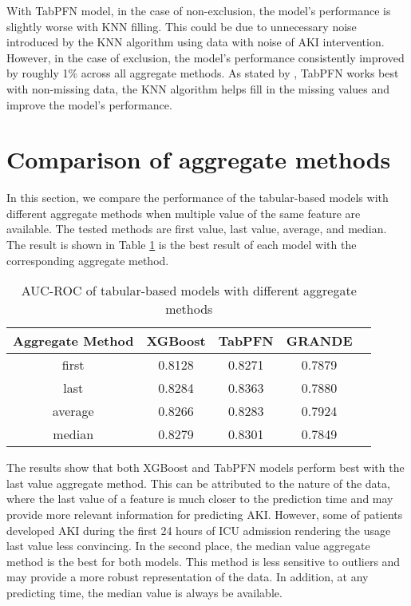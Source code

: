 \documentclass[../main.tex]{subfiles}
\begin{document}
With TabPFN model, in the case of non-exclusion, the model's performance is slightly worse with KNN filling.
This could be due to unnecessary noise introduced by the KNN algorithm using data with noise of AKI intervention.
However, in the case of exclusion, the model's performance consistently improved by roughly 1\% across all aggregate methods.
As stated by \citeauthor{tabpfn}, TabPFN works best with non-missing data, the KNN algorithm helps fill in the missing values and improve the model's performance.



\section{Comparison of aggregate methods}
\label{sec:aggregate_methods}

In this section, we compare the performance of the tabular-based models with different aggregate methods when multiple value of the same feature are available.
The tested methods are first value, last value, average, and median.
The result is shown in Table \ref{tab:aggregate_methods} is the best result of each model with the corresponding aggregate method.

\begin{table}[H]
    \centering
    \caption{AUC-ROC of tabular-based models with different aggregate methods}
    \label{tab:aggregate_methods}
    \begin{tabular}{|c|c|c|c|c|}
        \hline
        \textbf{Aggregate Method} & 
        \textbf{XGBoost} & 
        \textbf{TabPFN} & 
        \textbf{GRANDE} \\
        \hline

        first & 
        0.8128 & 
        0.8271 & 
        0.7879 \\

        last & 
        0.8284 & 
        0.8363 & 
        0.7880 \\

        average & 
        0.8266 & 
        0.8283 & 
        0.7924 \\

        median &
        0.8279 &
        0.8301 &
        0.7849 \\

        \hline
    \end{tabular}
\end{table}

The results show that both XGBoost and TabPFN models perform best with the last value aggregate method.
This can be attributed to the nature of the data, where the last value of a feature is much closer to the prediction time and may provide more relevant information for predicting AKI.
However, some of patients developed AKI during the first 24 hours of ICU admission rendering the usage last value less convincing.
In the second place, the median value aggregate method is the best for both models.
This method is less sensitive to outliers and may provide a more robust representation of the data.
In addition, at any predicting time, the median value is always be available.
\end{document}
